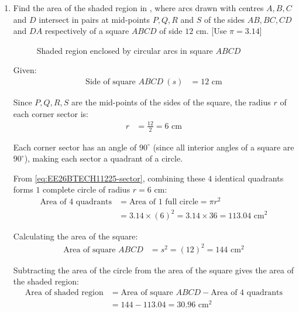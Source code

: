 \begin{enumerate}[label=\thesubsection.\arabic*, ref=\thesubsection.\theenumi]
\begin{enumerate}[label=(\alph*), leftmargin=1.5em, labelsep=0.5em]
    \end{enumerate}
   \item Find the area of the shaded region in , where arcs drawn with centres $A, B, C$ and $D$ intersect in pairs at mid-points $P, Q, R$ and $S$ of the sides $AB, BC, CD$ and $DA$ respectively of a square $ABCD$ of side $12\text{ cm}$. [Use $\pi = 3.14$]

\begin{figure}[H]
\centering

\caption{Shaded region enclosed by circular arcs in square $ABCD$}
\label{fig:shaded_q20}
\end{figure}		 \vspace{2pt}


\solution Given:
\begin{align}
    \text{Side of square } ABCD \ (s) &= 12\text{ cm}
\end{align}

Since $P, Q, R, S$ are the mid-points of the sides of the square, the radius $r$ of each corner sector is:
\begin{align}
    r &= \frac{12}{2} = 6\text{ cm}
\end{align}

Each corner sector has an angle of $90^\circ$ (since all interior angles of a square are $90^\circ$), making each sector a quadrant of a circle. 

From \eqref{eq:EE26BTECH11225-sector}, combining these $4$ identical quadrants forms $1$ complete circle of radius $r = 6\text{ cm}$:
\begin{align}
    \text{Area of } 4\text{ quadrants} &= \text{Area of } 1\text{ full circle} = \pi r^2 \\
    &= 3.14 \times (6)^2 = 3.14 \times 36 = 113.04\text{ cm}^2
\end{align}

Calculating the area of the square:
\begin{align}
    \text{Area of square } ABCD &= s^2 = (12)^2 = 144\text{ cm}^2
\end{align}

Subtracting the area of the circle from the area of the square gives the area of the shaded region:
\begin{align}
    \text{Area of shaded region} &= \text{Area of square } ABCD - \text{Area of } 4\text{ quadrants} \\
    &= 144 - 113.04 = 30.96\text{ cm}^2
\end{align}


\end{enumerate}
